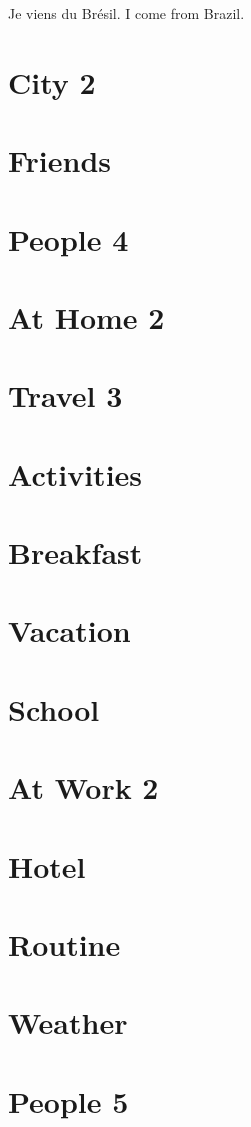 \documentclass[a4paper,11pt,oneside]{book}
\begin{document}
Je viens du Brésil.
I come from Brazil.



\section{City 2}
\section{Friends}
\section{People 4}
\section{At Home 2}
\section{Travel 3}
\section{Activities}
\section{Breakfast}
\section{Vacation}
\section{School}
\section{At Work 2}
\section{Hotel}
\section{Routine}
\section{Weather}
\section{People 5}
\end{document}
